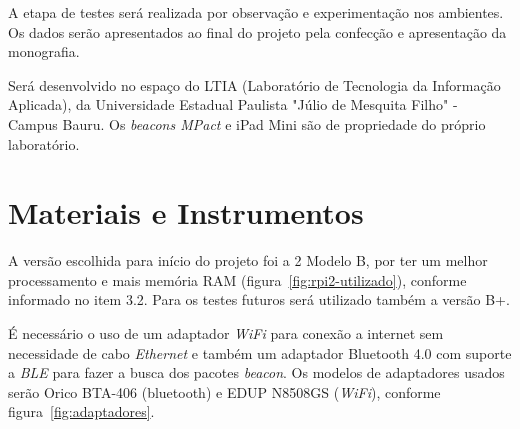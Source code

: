 \documentclass[
	12pt,				%
	openright,			%
	oneside,			%
	a4paper,			%
	chapter=TITLE,		%
	english,			%
	brazil				%
	]{abntex2}
\begin{document}
{A etapa de testes será realizada por observação e experimentação nos ambientes. Os dados serão apresentados ao final do projeto pela confecção e apresentação da monografia.

Será desenvolvido no espaço do LTIA (Laboratório de Tecnologia da Informação Aplicada), da Universidade Estadual Paulista "Júlio de Mesquita Filho" - Campus Bauru. Os \textit{beacons MPact} e iPad Mini são de propriedade do próprio laboratório.



\chapter{Materiais e Instrumentos}

A versão escolhida para início do projeto foi a 2 Modelo B, por ter um melhor processamento e mais memória RAM (figura~\ref{fig:rpi2-utilizado}), conforme informado no item 3.2. Para os testes futuros será utilizado também a versão B+.

\begin{figure}[h!]
\end{figure}

É necessário o uso de um adaptador \textit{WiFi} para conexão a internet sem necessidade de cabo \textit{Ethernet} e também um adaptador Bluetooth 4.0 com suporte a \textit{BLE} para fazer a busca dos pacotes \textit{beacon}. Os modelos de adaptadores usados serão Orico BTA-406 (bluetooth) e EDUP N8508GS (\textit{WiFi}), conforme figura~\ref{fig:adaptadores}.

}
\end{document}
